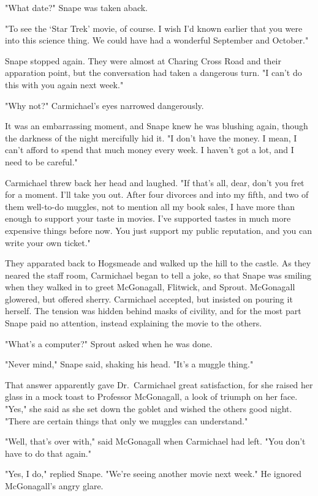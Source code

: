 "What date?" Snape was taken aback.

"To see the `Star Trek' movie, of course. I wish I'd known earlier that you were into this science thing. We could have had a wonderful September and October."

Snape stopped again. They were almost at Charing Cross Road and their apparation point, but the conversation had taken a dangerous turn. "I can't do this with you again next week."

"Why not?" Carmichael's eyes narrowed dangerously.

It was an embarrassing moment, and Snape knew he was blushing again, though the darkness of the night mercifully hid it. "I don't have the money. I mean, I can't afford to spend that much money every week. I haven't got a lot, and I need to be careful."

Carmichael threw back her head and laughed. "If that's all, dear, don't you fret for a moment. I'll take you out. After four divorces and into my fifth, and two of them well-to-do muggles, not to mention all my book sales, I have more than enough to support your taste in movies. I've supported tastes in much more expensive things before now. You just support my public reputation, and you can write your own ticket."

They apparated back to Hogsmeade and walked up the hill to the castle. As they neared the staff room, Carmichael began to tell a joke, so that Snape was smiling when they walked in to greet McGonagall, Flitwick, and Sprout. McGonagall glowered, but offered sherry. Carmichael accepted, but insisted on pouring it herself. The tension was hidden behind masks of civility, and for the most part Snape paid no attention, instead explaining the movie to the others.

"What's a computer?" Sprout asked when he was done.

"Never mind," Snape said, shaking his head. "It's a muggle thing."

That answer apparently gave Dr.~Carmichael great satisfaction, for she raised her glass in a mock toast to Professor McGonagall, a look of triumph on her face. "Yes," she said as she set down the goblet and wished the others good night. "There are certain things that only we muggles can understand."

"Well, that's over with," said McGonagall when Carmichael had left. "You don't have to do that again."

"Yes, I do," replied Snape. "We're seeing another movie next week." He ignored McGonagall's angry glare.

